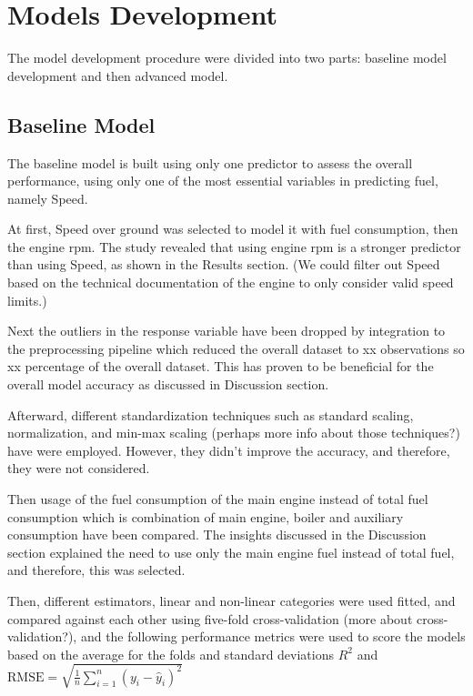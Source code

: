 \section{Models Development}\label{sec:models_development}

The model development procedure were divided into two parts: baseline model development and then advanced model. 

\subsection{Baseline Model}\label{sec:baseline_model}

The baseline model is built using only one predictor to assess the overall performance, using only one of the most essential variables in predicting fuel, namely Speed. 

At first, Speed over ground was selected to model it with fuel consumption, then the engine rpm. The study revealed that using engine rpm is a stronger predictor than using Speed, as shown in the Results section. (We could filter out Speed based on the technical documentation of the engine to only consider valid speed limits.)

Next the outliers in the response variable have been dropped by integration to the preprocessing pipeline which reduced the overall dataset to xx observations so xx percentage of the overall dataset. This has proven to be beneficial for the overall model accuracy as discussed in Discussion section. 

Afterward, different standardization techniques such as standard scaling, normalization, and min-max scaling (perhaps more info about those techniques?) have were employed. However, they didn't improve the accuracy, and therefore, they were not considered. 

Then usage of the fuel consumption of the main engine instead of total fuel consumption which is combination of main engine, boiler and auxiliary consumption have been compared. The insights discussed in the Discussion section explained the need to use only the main engine fuel instead of total fuel, and therefore, this was selected. 

Then, different estimators, linear and non-linear categories were used fitted, and compared against each other using five-fold cross-validation (more about cross-validation?), and the following performance metrics were used to score the models based on the average for the folds and standard deviations $R^2$ and 
$\text{RMSE} = \sqrt{\frac{1}{n} \sum_{i=1}^{n} (y_i - \hat{y}_i)^2}$

